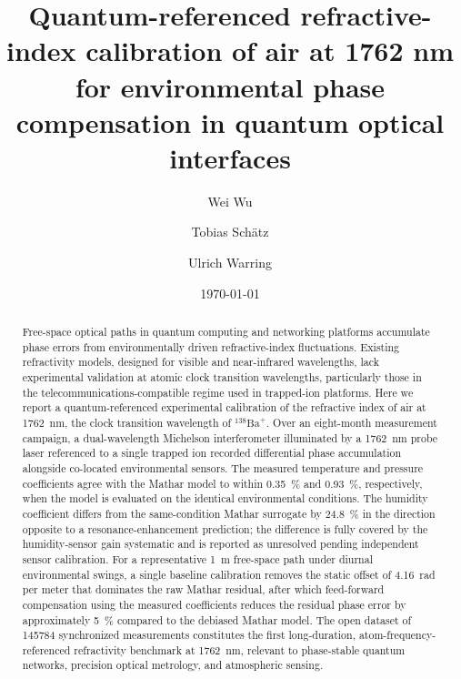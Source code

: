 \documentclass[aps,prapplied,reprint,groupedaddress,twocolumn,superscriptaddress,linenumbers]{revtex4-2}
\begin{document}
\preprint{}

\title{Quantum-referenced refractive-index calibration of air at 1762 nm for environmental phase compensation in quantum optical interfaces}

\author{Wei Wu}
\author{Tobias Sch{\"a}tz}
\author{Ulrich Warring}

\date{\today}

\begin{abstract}
Free-space optical paths in quantum computing and networking platforms accumulate phase errors from environmentally driven refractive-index fluctuations. Existing refractivity models, designed for visible and near-infrared wavelengths, lack experimental validation at atomic clock transition wavelengths, particularly those in the telecommunications-compatible regime used in trapped-ion platforms. Here we report a quantum-referenced experimental calibration of the refractive index of air at \SI{1762}{\nano\meter}, the clock transition wavelength of $^{138}\mathrm{Ba}^+$. Over an eight-month measurement campaign, a dual-wavelength Michelson interferometer illuminated by a \SI{1762}{\nano\meter} probe laser referenced to a single trapped ion recorded differential phase accumulation alongside co-located environmental sensors. The measured temperature and pressure coefficients agree with the Mathar model to within \SI{0.35}{\percent} and \SI{0.93}{\percent}, respectively, when the model is evaluated on the identical environmental conditions. The humidity coefficient differs from the same-condition Mathar surrogate by \SI{24.8}{\percent} in the direction opposite to a resonance-enhancement prediction; the difference is fully covered by the humidity-sensor gain systematic and is reported as unresolved pending independent sensor calibration. For a representative \SI{1}{\meter} free-space path under diurnal environmental swings, a single baseline calibration removes the static offset of \SI{4.16}{\radian} per meter that dominates the raw Mathar residual, after which feed-forward compensation using the measured coefficients reduces the residual phase error by approximately \SI{5}{\percent} compared to the debiased Mathar model. The open dataset of \num{145784} synchronized measurements constitutes the first long-duration, atom-frequency-referenced refractivity benchmark at \SI{1762}{\nano\meter}, relevant to phase-stable quantum networks, precision optical metrology, and atmospheric sensing.
\end{abstract}
\end{document}
